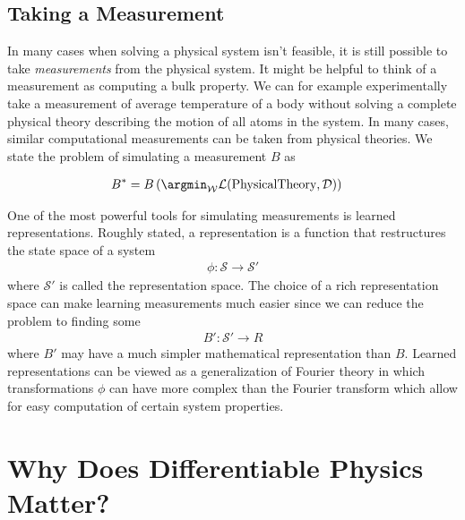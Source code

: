 \documentclass[book.tex]{subfiles}
\begin{document}

\subsection{Taking a Measurement}

In many cases when solving a physical system isn't feasible, it is still possible to take \textit{measurements} from the physical system. It might be helpful to think of a measurement as computing a bulk property. We can for example experimentally take a measurement of average temperature of a body without solving a complete physical theory describing the motion of all atoms in the system. In many cases, similar computational measurements can be taken from physical theories. We state the problem of simulating a measurement $B$ as

\begin{align}
B^* &= B\left (\argmin_{\mathcal{W}} \mathcal{L}(\textrm{PhysicalTheory}, \mathcal{D}) \right)
\end{align}

One of the most powerful tools for simulating measurements is learned representations. Roughly stated, a representation is a function that restructures the state space of a system
\begin{align}
    \phi: \mathcal{S} \to \mathcal{S}'
\end{align}
where $\mathcal{S}'$ is called the representation space. The choice of a rich representation space can make learning measurements much easier since we can reduce the problem to finding some
\begin{align}
    B': \mathcal{S}' \to R
\end{align}
where $B'$ may have a much simpler mathematical representation than $B$. Learned representations can be viewed as a generalization of Fourier theory in which transformations $\phi$ can have more complex than the Fourier transform which allow for easy computation of certain system properties.



\section{Why Does Differentiable Physics Matter?}
\end{document}
